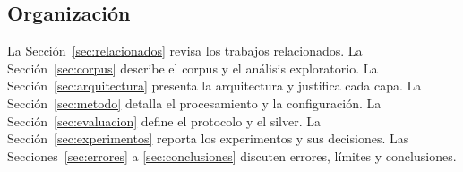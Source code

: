 \subsection{Organizaci\'on}

La Secci\'on~\ref{sec:relacionados} revisa los trabajos relacionados. La Secci\'on~\ref{sec:corpus} describe el corpus y el an\'alisis exploratorio. La Secci\'on~\ref{sec:arquitectura} presenta la arquitectura y justifica cada capa. La Secci\'on~\ref{sec:metodo} detalla el procesamiento y la configuraci\'on. La Secci\'on~\ref{sec:evaluacion} define el protocolo y el silver. La Secci\'on~\ref{sec:experimentos} reporta los experimentos y sus decisiones. Las Secciones~\ref{sec:errores} a \ref{sec:conclusiones} discuten errores, l\'imites y conclusiones.
